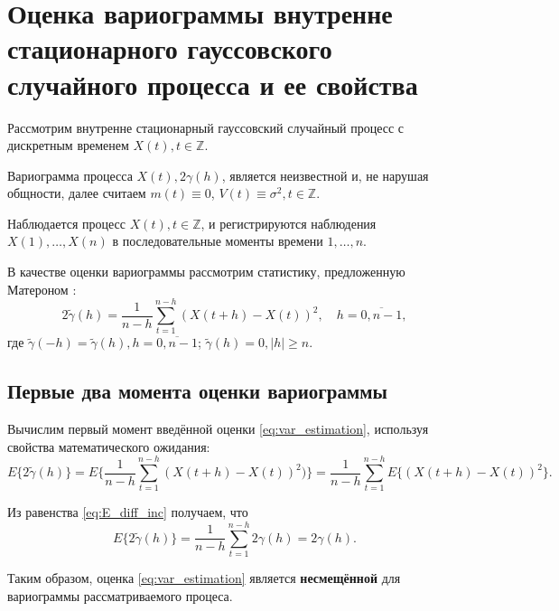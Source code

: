 
\newpage

\chapter{Оценка вариограммы внутренне стационарного гауссовского случайного процесса и ее свойства}
\label{c:variogram_estimation}

Рассмотрим внутренне стационарный гауссовский случайный процесс с дискретным временем $ X(t), t \in \mathbb{Z} $.

Вариограмма процесса $ X(t) , 2 \gamma(h) $, является неизвестной и, не нарушая общности, далее считаем $ m(t) \equiv 0 $, $ V(t) \equiv \sigma^2 , t \in \mathbb{Z}$.

Наблюдается процесс $ X(t), t \in \mathbb{Z} $, и регистрируются наблюдения $ X(1), \dots, X(n) $ в последовательные моменты времени $ 1, \dots, n $.

В качестве оценки вариограммы рассмотрим статистику, предложенную Матероном \cite{matheron1980}:
\begin{equation}
\label{eq:var_estimation}
	2 \tilde{\gamma}(h) = \frac{1}{n - h} \sum_{t = 1}^{n - h}(X(t + h) - X(t))^2, \quad h = \overline{0, n - 1},
\end{equation}
где $ \tilde{\gamma}(-h) = \tilde{\gamma}(h), h = \overline{0, n - 1}$; $ \tilde{\gamma}(h) = 0, \vert h \vert \ge n $.

\section{Первые два момента оценки вариограммы} %
\label{sec:variogram_moments}

Вычислим первый момент введённой оценки \eqref{eq:var_estimation}, используя свойства математического ожидания:
\begin{equation*}
	E \{ 2 \tilde{\gamma}(h) \} = E \{ \frac{1}{n - h} \sum_{t = 1}^{n - h}(X(t + h) - X(t))^2) \} = \frac{1}{n - h} \sum_{t = 1}^{n - h} E \{ (X(t + h) - X(t))^2 \}.
\end{equation*}

Из равенства \eqref{eq:E_diff_inc} получаем, что
\begin{equation*}
	E \{ 2 \tilde{\gamma}(h) \} = \frac{1}{n - h} \sum_{t = 1}^{n - h} 2 \gamma(h) = 2 \gamma(h).
\end{equation*}

Таким образом, оценка \eqref{eq:var_estimation} является \textbf{несмещённой} для вариограммы рассматриваемого процеса.


